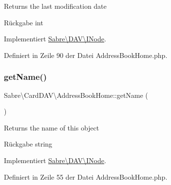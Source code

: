 Returns the last modification date

\begin{DoxyReturn}{Rückgabe}
int 
\end{DoxyReturn}


Implementiert \mbox{\hyperlink{interface_sabre_1_1_d_a_v_1_1_i_node_a06335f81c7d4ec2c6d9e327c8ce61014}{Sabre\textbackslash{}\+D\+A\+V\textbackslash{}\+I\+Node}}.



Definiert in Zeile 90 der Datei Address\+Book\+Home.\+php.

\mbox{\label{class_sabre_1_1_card_d_a_v_1_1_address_book_home_a4cfbe732cded342ce80e74fd4b4c321a}} 
\subsubsection{\texorpdfstring{get\+Name()}{getName()}}
{\footnotesize\ttfamily Sabre\textbackslash{}\+Card\+D\+A\+V\textbackslash{}\+Address\+Book\+Home\+::get\+Name (\begin{DoxyParamCaption}{ }\end{DoxyParamCaption})}

Returns the name of this object

\begin{DoxyReturn}{Rückgabe}
string 
\end{DoxyReturn}


Implementiert \mbox{\hyperlink{interface_sabre_1_1_d_a_v_1_1_i_node_ab616fe836b1ae36af12126a2bc934dce}{Sabre\textbackslash{}\+D\+A\+V\textbackslash{}\+I\+Node}}.



Definiert in Zeile 55 der Datei Address\+Book\+Home.\+php.

\mbox{\label{class_sabre_1_1_card_d_a_v_1_1_address_book_home_afc2b53f38407b25302906080cf04d176}} 
